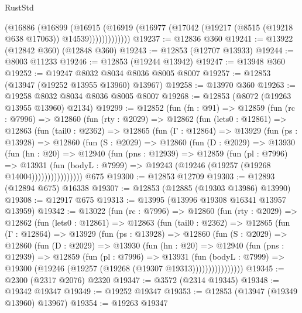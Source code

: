 \begin{lexlean}{RustStd}
\begin{coremodule}
                (@16886
                  (@16899
                    (@16915
                      (@16919
                        (@16977 (@17042 (@19217 (@8515 (@19218 @638 @17063)) @14539)))))))))))))
@19237 := @12836 @360
@19241 := @13922 (@12842 @360) (@12848 @360)
@19243 := @12853 (@12707 @13933)
@19244 := @8003 @11233
@19246 := @12853 (@19244 @13942)
@19247 := @13948 @360
@19252 := @19247 @8032 @8034 @8036 @8005 @8007
@19257 := @12853 (@13947 (@19252 @13955 @13960) @13967)
@19258 := @13970 @360
@19263 := @19258 @8032 @8034 @8036 @8005 @8007
@19268 := @12853 (@8072 (@19263 @13955 @13960) @2134)
@19299 := @12852
    (fun (fn : @91) =>
    @12859
      (fun (rc : @7996) =>
      @12860
        (fun (rty : @2029) =>
        @12862
          (fun (lets0 : @12861) =>
          @12863
            (fun (tail0 : @2362) =>
            @12865
              (fun (Γ : @12864) =>
              @13929
                (fun (ps : @13928) =>
                @12860
                  (fun (S : @2029) =>
                  @12860
                    (fun (D : @2029) =>
                    @13930
                      (fun (hn : @20) =>
                      @12940
                        (fun (pns : @12939) =>
                        @12859
                          (fun (pl : @7996) =>
                          @13931
                            (fun (bodyL : @7999) =>
                            @19243 (@19246 (@19257 (@19268 @14004))))))))))))))))
    @675
@19300 := @12853 @12709
@19303 := @12893 (@12894 @675) @16338
@19307 := @12853 (@12885 (@19303 @13986) @13990)
@19308 := @12917 @675
@19313 := @13995 (@13996 @19308 @16341 @13957 @13959)
@19342 := @13022
    (fun (rc : @7996) =>
    @12860
      (fun (rty : @2029) =>
      @12862
        (fun (lets0 : @12861) =>
        @12863
          (fun (tail0 : @2362) =>
          @12865
            (fun (Γ : @12864) =>
            @13929
              (fun (ps : @13928) =>
              @12860
                (fun (S : @2029) =>
                @12860
                  (fun (D : @2029) =>
                  @13930
                    (fun (hn : @20) =>
                    @12940
                      (fun (pns : @12939) =>
                      @12859
                        (fun (pl : @7996) =>
                        @13931
                          (fun (bodyL : @7999) =>
                          @19300 (@19246 (@19257 (@19268 (@19307 @19313))))))))))))))))
@19345 := @2300 (@2317 @2076) @2320
@19347 := @3572 (@2314 @19345)
@19348 := @19342 @19347
@19349 := @19252 @19347
@19353 := @12853 (@13947 (@19349 @13960) @13967)
@19354 := @19263 @19347

\end{coremodule}
\end{lexlean}
